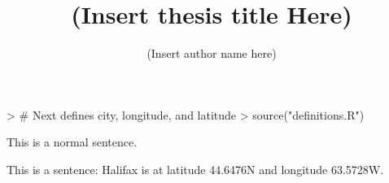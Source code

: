 \documentclass[12pt,timestamp,landuse]{ocethesis}
\begin{document}
\begin{Schunk}
\begin{Sinput}
> # Next defines city, longitude, and latitude
> source("definitions.R")
\end{Sinput}
\end{Schunk}


\msc %
\title{(Insert thesis title Here)}
\author{(Insert author name here)}



\frontmatter





\mainmatter

This is a normal sentence.

This is a sentence: Halifax is at latitude 44.6476N and longitude
63.5728W.




\appendix



\end{document}
